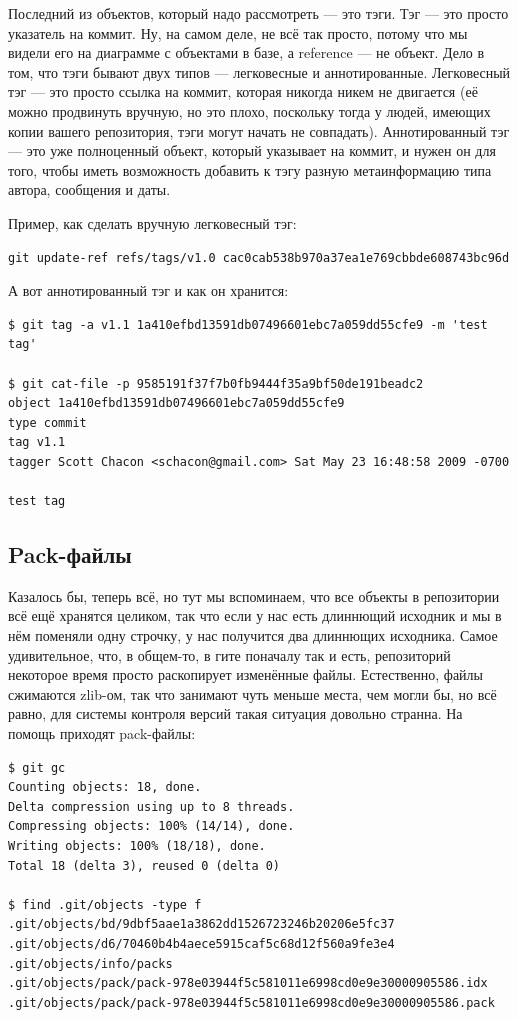 \documentclass{../../text-style}
\begin{document}
Последний из объектов, который надо рассмотреть --- это тэги. Тэг --- это просто указатель на коммит. Ну, на самом деле, не всё так просто, потому что мы видели его на диаграмме с объектами в базе, а reference --- не объект. Дело в том, что тэги бывают двух типов --- легковесные и аннотированные. Легковесный тэг --- это просто ссылка на коммит, которая никогда никем не двигается (её можно продвинуть вручную, но это плохо, поскольку тогда у людей, имеющих копии вашего репозитория, тэги могут начать не совпадать). Аннотированный тэг --- это уже полноценный объект, который указывает на коммит, и нужен он для того, чтобы иметь возможность добавить к тэгу разную метаинформацию типа автора, сообщения и даты.

Пример, как сделать вручную легковесный тэг:
\begin{verbatim}
git update-ref refs/tags/v1.0 cac0cab538b970a37ea1e769cbbde608743bc96d
\end{verbatim}

А вот аннотированный тэг и как он хранится:
\begin{verbatim}
$ git tag -a v1.1 1a410efbd13591db07496601ebc7a059dd55cfe9 -m 'test tag'

$ git cat-file -p 9585191f37f7b0fb9444f35a9bf50de191beadc2
object 1a410efbd13591db07496601ebc7a059dd55cfe9
type commit
tag v1.1
tagger Scott Chacon <schacon@gmail.com> Sat May 23 16:48:58 2009 -0700

test tag
\end{verbatim}

\subsection{Pack-файлы}

Казалось бы, теперь всё, но тут мы вспоминаем, что все объекты в репозитории всё ещё хранятся целиком, так что если у нас есть длиннющий исходник и мы в нём поменяли одну строчку, у нас получится два длиннющих исходника. Самое удивительное, что, в общем-то, в гите поначалу так и есть, репозиторий некоторое время просто раскопирует изменённые файлы. Естественно, файлы сжимаются zlib-ом, так что занимают чуть меньше места, чем могли бы, но всё равно, для системы контроля версий такая ситуация довольно странна. На помощь приходят pack-файлы:

\begin{verbatim}
$ git gc
Counting objects: 18, done.
Delta compression using up to 8 threads.
Compressing objects: 100% (14/14), done.
Writing objects: 100% (18/18), done.
Total 18 (delta 3), reused 0 (delta 0)

$ find .git/objects -type f
.git/objects/bd/9dbf5aae1a3862dd1526723246b20206e5fc37
.git/objects/d6/70460b4b4aece5915caf5c68d12f560a9fe3e4
.git/objects/info/packs
.git/objects/pack/pack-978e03944f5c581011e6998cd0e9e30000905586.idx
.git/objects/pack/pack-978e03944f5c581011e6998cd0e9e30000905586.pack
\end{verbatim}
\end{document}
